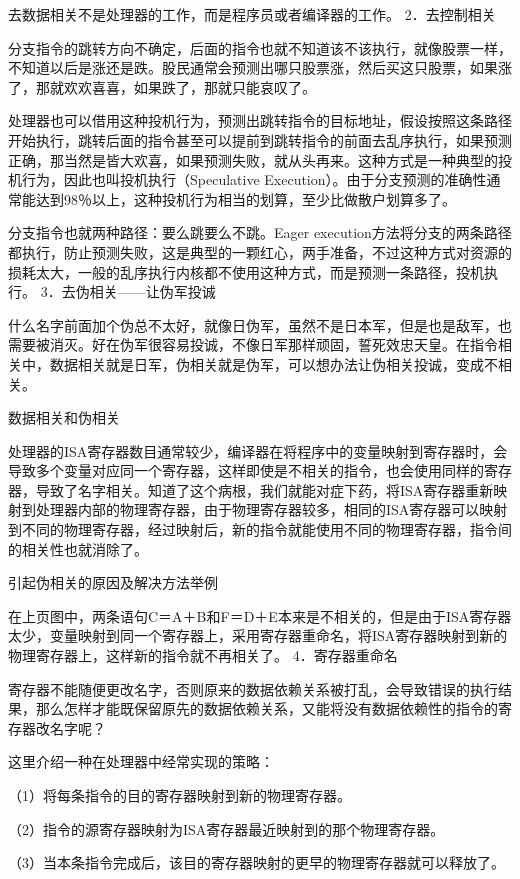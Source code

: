 \documentclass[12pt,UTF8]{ctexbook}
\begin{document}
去数据相关不是处理器的工作，而是程序员或者编译器的工作。
2．去控制相关

分支指令的跳转方向不确定，后面的指令也就不知道该不该执行，就像股票一样，不知道以后是涨还是跌。股民通常会预测出哪只股票涨，然后买这只股票，如果涨了，那就欢欢喜喜，如果跌了，那就只能哀叹了。

处理器也可以借用这种投机行为，预测出跳转指令的目标地址，假设按照这条路径开始执行，跳转后面的指令甚至可以提前到跳转指令的前面去乱序执行，如果预测正确，那当然是皆大欢喜，如果预测失败，就从头再来。这种方式是一种典型的投机行为，因此也叫投机执行（Speculative Execution）。由于分支预测的准确性通常能达到98％以上，这种投机行为相当的划算，至少比做散户划算多了。

分支指令也就两种路径：要么跳要么不跳。Eager execution方法将分支的两条路径都执行，防止预测失败，这是典型的一颗红心，两手准备，不过这种方式对资源的损耗太大，一般的乱序执行内核都不使用这种方式，而是预测一条路径，投机执行。
3．去伪相关——让伪军投诚

什么名字前面加个伪总不太好，就像日伪军，虽然不是日本军，但是也是敌军，也需要被消灭。好在伪军很容易投诚，不像日军那样顽固，誓死效忠天皇。在指令相关中，数据相关就是日军，伪相关就是伪军，可以想办法让伪相关投诚，变成不相关。

数据相关和伪相关

处理器的ISA寄存器数目通常较少，编译器在将程序中的变量映射到寄存器时，会导致多个变量对应同一个寄存器，这样即使是不相关的指令，也会使用同样的寄存器，导致了名字相关。知道了这个病根，我们就能对症下药，将ISA寄存器重新映射到处理器内部的物理寄存器，由于物理寄存器较多，相同的ISA寄存器可以映射到不同的物理寄存器，经过映射后，新的指令就能使用不同的物理寄存器，指令间的相关性也就消除了。

引起伪相关的原因及解决方法举例

在上页图中，两条语句C＝A＋B和F＝D＋E本来是不相关的，但是由于ISA寄存器太少，变量映射到同一个寄存器上，采用寄存器重命名，将ISA寄存器映射到新的物理寄存器上，这样新的指令就不再相关了。
4．寄存器重命名

寄存器不能随便更改名字，否则原来的数据依赖关系被打乱，会导致错误的执行结果，那么怎样才能既保留原先的数据依赖关系，又能将没有数据依赖性的指令的寄存器改名字呢？

这里介绍一种在处理器中经常实现的策略：

（1）将每条指令的目的寄存器映射到新的物理寄存器。

（2）指令的源寄存器映射为ISA寄存器最近映射到的那个物理寄存器。

（3）当本条指令完成后，该目的寄存器映射的更早的物理寄存器就可以释放了。
\end{document}
